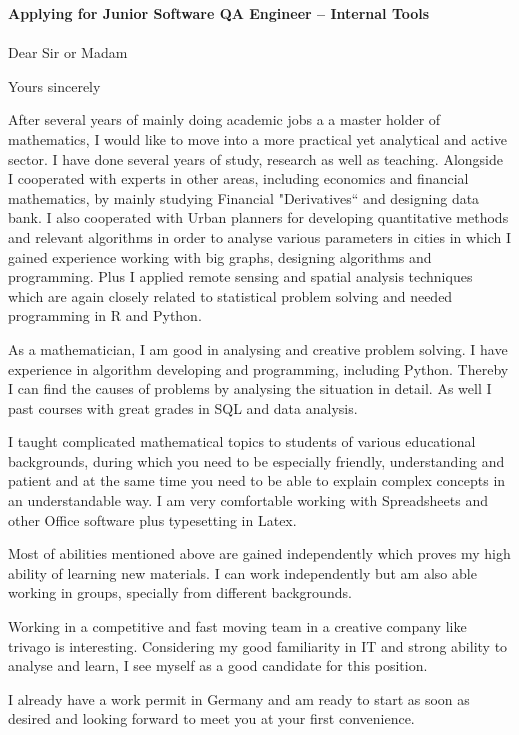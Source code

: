 \documentclass[11pt,a4paper,sans]{moderncv}        %
\title{}                               %
\begin{document}
\date{Feb. 12, 2016}
\opening{\textbf{Applying for  Junior Software QA Engineer – Internal Tools}\\ \  \\ Dear Sir or Madam}
\closing{Yours sincerely }
\enclosure[Enclosure]{}          %
\makelettertitle

After several years of mainly doing academic jobs a a  master holder of mathematics, I would like to move into a more practical yet analytical and active sector. I have done several years of study, research as well as teaching. Alongside I cooperated with experts in other areas, including economics  and financial mathematics, by mainly studying Financial "Derivatives`` and designing data bank. I also cooperated with Urban planners for developing quantitative methods and relevant algorithms in order to analyse various parameters in cities in which I gained experience working with big graphs, designing algorithms and programming. Plus I  applied remote sensing and spatial analysis techniques which are again closely related to statistical problem solving and needed programming in R and Python.

As a mathematician, I am good in analysing and creative problem solving. I have experience in algorithm developing and programming, including Python. Thereby I can find the causes of problems by analysing the situation in detail. As well I past courses with great grades in SQL and data analysis.

I taught complicated mathematical topics to students of various educational backgrounds, during which you need to be especially friendly, understanding and patient and at the same time you need to be able to explain complex concepts in an understandable way.  
I am very comfortable working with Spreadsheets and other Office software plus typesetting in Latex. 

Most of abilities mentioned above are gained independently which proves my high ability of learning new materials. I can work independently but am also able working in groups, specially from different backgrounds.

Working in a competitive and fast moving team in a creative company like trivago is interesting. Considering my good familiarity in IT and strong ability to analyse and learn, I see myself as a good candidate for this position.

I already have a work permit in Germany and am ready to start as soon as desired and  looking forward to meet you at your first convenience.
 \vspace{3mm}
 
\makeletterclosing
\end{document}
